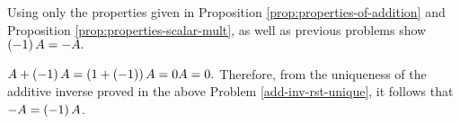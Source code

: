 \begin{enumialphparenastyle}
\begin{ex} Using only the properties given in Proposition \ref{prop:properties-of-addition} and 
Proposition \ref{prop:properties-scalar-mult}, as well as previous
problems show $\left(-1\right) A=-A.$
\begin{sol}
$A+\left(-1\right) A=\left(1+\left(
-1\right) \right) A=0A=0.$ Therefore, from the uniqueness of the additive
inverse proved in the above Problem \ref{add-inv-rst-unique}, it follows that $
-A=\left(-1\right) A$.
\end{sol}
\end{ex}

\end{enumialphparenastyle}

